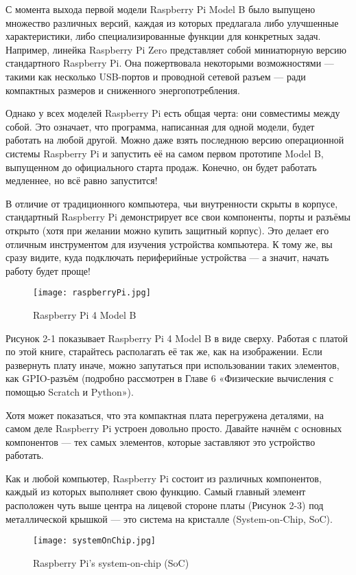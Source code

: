 С момента выхода первой модели Raspberry Pi Model B было выпущено множество различных версий, каждая из которых предлагала либо улучшенные характеристики, либо специализированные функции для конкретных задач. Например, линейка Raspberry Pi Zero представляет собой миниатюрную версию стандартного Raspberry Pi. Она пожертвовала некоторыми возможностями — такими как несколько USB-портов и проводной сетевой разъем — ради компактных размеров и сниженного энергопотребления.

Однако у всех моделей Raspberry Pi есть общая черта: они совместимы между собой. Это означает, что программа, написанная для одной модели, будет работать на любой другой.
Можно даже взять последнюю версию операционной системы Raspberry Pi и запустить её на самом первом прототипе Model B, выпущенном до официального старта продаж. Конечно, он будет работать медленнее, но всё равно запустится!

В отличие от традиционного компьютера, чьи внутренности скрыты в корпусе, стандартный Raspberry Pi демонстрирует все свои компоненты, порты и разъёмы открыто (хотя при желании можно купить защитный корпус). Это делает его отличным инструментом для изучения устройства компьютера. К тому же, вы сразу видите, куда подключать периферийные устройства — а значит, начать работу будет проще!

\begin{figure}[H]
	\centering
	\texttt{[image: raspberryPi.jpg]}
	\caption{Raspberry Pi 4 Model B}
\end{figure}

Рисунок 2-1 показывает Raspberry Pi 4 Model B в виде сверху. Работая с платой по этой книге, старайтесь располагать её так же, как на изображении. Если развернуть плату иначе, можно запутаться при использовании таких элементов, как GPIO-разъём (подробно рассмотрен в Главе 6 «Физические вычисления с помощью Scratch и Python»).

Хотя может показаться, что эта компактная плата перегружена деталями, на самом деле Raspberry Pi устроен довольно просто. Давайте начнём с основных компонентов — тех самых элементов, которые заставляют это устройство работать.


Как и любой компьютер, Raspberry Pi состоит из различных компонентов, каждый из которых выполняет свою функцию. Самый главный элемент расположен чуть выше центра на лицевой стороне платы (Рисунок 2-3) под металлической крышкой — это система на кристалле (System-on-Chip, SoC).

\begin{figure}[H]
	\centering
	\texttt{[image: systemOnChip.jpg]}
	\caption{Raspberry Pi’s system-on-chip (SoC)}
\end{figure}

